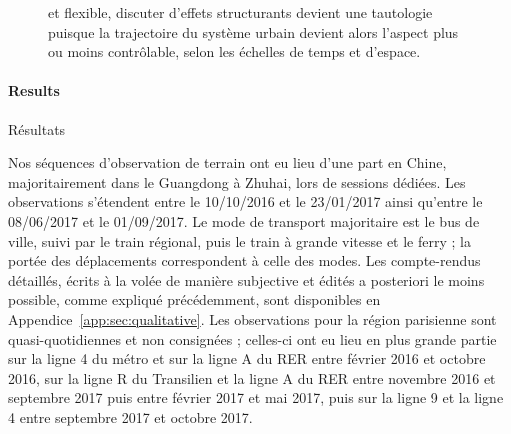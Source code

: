 \begin{figure}[h!]
\begin{mdframed}
et flexible, discuter d'effets structurants devient une tautologie puisque la trajectoire du système urbain devient alors l'aspect plus ou moins contrôlable, selon les échelles de temps et d'espace.


\medskip

\end{mdframed}
\end{figure}



\paragraph{Results}{Résultats}

Nos séquences d'observation de terrain ont eu lieu d'une part en Chine, majoritairement dans le Guangdong à Zhuhai, lors de sessions dédiées. Les observations s'étendent entre le 10/10/2016 et le 23/01/2017 ainsi qu'entre le 08/06/2017 et le 01/09/2017. Le mode de transport majoritaire est le bus de ville, suivi par le train régional, puis le train à grande vitesse et le ferry ; la portée des déplacements correspondent à celle des modes. Les compte-rendus détaillés, écrits à la volée de manière subjective et édités a posteriori le moins possible, comme expliqué précédemment, sont disponibles en Appendice~\ref{app:sec:qualitative}. Les observations pour la région parisienne sont quasi-quotidiennes et non consignées ; celles-ci ont eu lieu en plus grande partie sur la ligne 4 du métro et sur la ligne A du RER entre février 2016 et octobre 2016, sur la ligne R du Transilien et la ligne A du RER entre novembre 2016 et septembre 2017 puis entre février 2017 et mai 2017, puis sur la ligne 9 et la ligne 4 entre septembre 2017 et octobre 2017.


